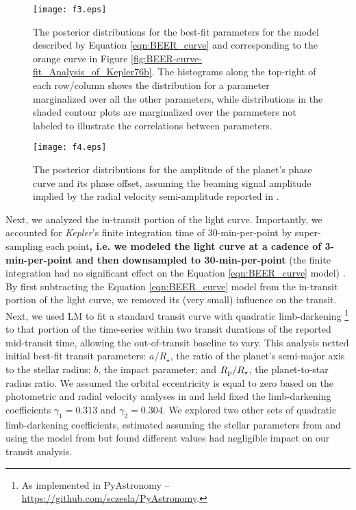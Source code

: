 \documentclass[manuscript]{aastex62}
\newcommand{\kepler}{{\it Kepler}}
\begin{document}
\begin{figure}
\texttt{[image: f3.eps]}
\caption{The posterior distributions for the best-fit parameters for the model described by Equation \ref{eqn:BEER_curve} and corresponding to the orange curve in Figure \ref{fig:BEER-curve-fit_Analysis_of_Kepler76b}. The histograms along the top-right of each row/column shows the distribution for a parameter marginalized over all the other parameters, while distributions in the shaded contour plots are marginalized over the parameters not labeled to illustrate the correlations between parameters. \label{fig:BEER-curve-fit-params_Analysis-of-Kepler76b}}
\end{figure}

\begin{figure}
\texttt{[image: f4.eps]}
\caption{The posterior distributions for the amplitude of the planet's phase curve and its phase offset, assuming the beaming signal amplitude implied by the radial velocity semi-amplitude reported in \citet{2013ApJ...771...26F}. \label{fig:Aplanet-delta-fit-params_Analysis-of-Kepler76b}}
\end{figure}

Next, we analyzed the in-transit portion of the light curve. Importantly, we accounted for \kepler's finite integration time of 30-min-per-point by super-sampling each point\textbf{, i.e. we modeled the light curve at a cadence of 3-min-per-point and then downsampled to 30-min-per-point} (the finite integration had no significant effect on the Equation \ref{eqn:BEER_curve} model) \citep[cf.][]{2010MNRAS.408.1758K}. By first subtracting the Equation \ref{eqn:BEER_curve} model from the in-transit portion of the light curve, we removed its (very small) influence on the transit. Next, we used LM to fit a standard transit curve with quadratic limb-darkening \citep{2002ApJ...580L.171M}\footnote{As implemented in PyAstronomy -- \url{https://github.com/sczesla/PyAstronomy}.} to that portion of the time-series within two transit durations of the reported mid-transit time, allowing the out-of-transit baseline to vary. This analysis netted initial best-fit transit parameters: $a/R_\star$, the ratio of the planet's semi-major axis to the stellar radius; $b$, the impact parameter; and $R_{\rm p}/R_\star$, the planet-to-star radius ratio. We assumed the orbital eccentricity is equal to zero based on the photometric and radial velocity analyses in \citet{2013ApJ...771...26F} and held fixed the limb-darkening coefficients $\gamma_1 = 0.313$ and $\gamma_2 = 0.304$. We explored two other sets of quadratic limb-darkening coefficients, estimated assuming the stellar parameters from \citet{2013ApJ...771...26F} and using the model from \citet{2015MNRAS.450.1879E} but found different values had negligible impact on our transit analysis. 
\end{document}
